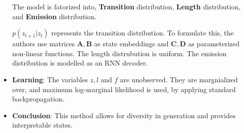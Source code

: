 \documentclass[12pt]{article}
\begin{document}
\begin{itemize}[leftmargin=*,label={}]
The model is fatorized into, \textbf{Transition} distribution, \textbf{Length} distribution, and \textbf{Emission} distribution.

$p(z_{t+1}|z_t)$ represents the transition distribution. To formulate this, the authors use matrices $\mathbf{A, B}$ as state embeddings and $\mathbf{C}, \mathbf{D}$ as parameterized non-linear functions. The length distrubution is uniform. The emission distribution is modelled as an RNN decoder.

\item \textbf{Learning}: The variables $z, l$ and $f$ are unobserved. They are margnialized over, and maximum log-marginal likelihood is used, by applying standard backpropagation.

\item \textbf{Conclusion}: This method allows for diversity in generation and provides interpretable states. 
\end{itemize}
\end{document}
